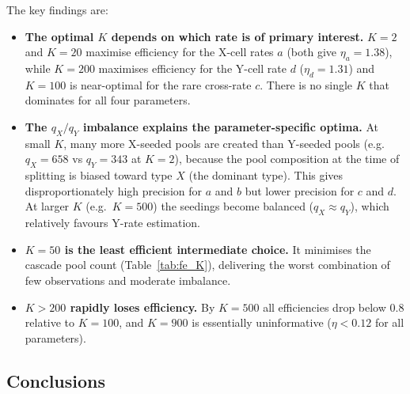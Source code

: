 \documentclass[12pt]{article}
\begin{document}
The key findings are:
\begin{itemize}
  \item \textbf{The optimal $K$ depends on which rate is of primary interest.}
        $K = 2$ and $K = 20$ maximise efficiency for the X-cell rates $a$ (both
        give $\eta_a = 1.38$), while $K = 200$ maximises efficiency for the
        Y-cell rate $d$ ($\eta_d = 1.31$) and $K = 100$ is near-optimal for
        the rare cross-rate $c$.  There is no single $K$ that dominates for
        all four parameters.

  \item \textbf{The $q_X / q_Y$ imbalance explains the parameter-specific
        optima.}  At small $K$, many more X-seeded pools are created than
        Y-seeded pools (e.g.\ $q_X = 658$ vs $q_Y = 343$ at $K = 2$),
        because the pool composition at the time of splitting is biased
        toward type $X$ (the dominant type).  This gives disproportionately
        high precision for $a$ and $b$ but lower precision for $c$ and $d$.
        At larger $K$ (e.g.\ $K = 500$) the seedings become balanced
        ($q_X \approx q_Y$), which relatively favours Y-rate estimation.

  \item \textbf{$K = 50$ is the least efficient intermediate choice.}  It
        minimises the cascade pool count (Table~\ref{tab:fe_K}), delivering
        the worst combination of few observations and moderate imbalance.

  \item \textbf{$K > 200$ rapidly loses efficiency.}  By $K = 500$ all
        efficiencies drop below 0.8 relative to $K = 100$, and $K = 900$
        is essentially uninformative ($\eta < 0.12$ for all parameters).
\end{itemize}

\subsection{Conclusions}
\end{document}
